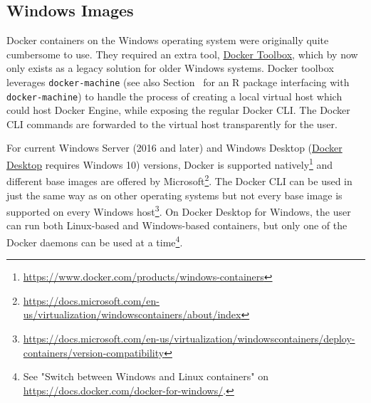 \hypertarget{windows-images}{%
\subsection{Windows Images}\label{windows-images}}

\label{windows}

Docker containers on the Windows operating system were originally quite
cumbersome to use. They required an extra tool,
\href{https://docs.docker.com/toolbox/}{Docker Toolbox}, which by now
only exists as a legacy solution for older Windows systems. Docker
toolbox leverages \texttt{docker-machine} (see also
Section~ for an R package interfacing with
\texttt{docker-machine}) to handle the process of creating a local
virtual host which could host Docker Engine, while exposing the regular
Docker CLI. The Docker CLI commands are forwarded to the virtual host
transparently for the user.

For current Windows Server (2016 and later) and Windows Desktop
(\href{https://www.docker.com/products/docker-desktop}{Docker Desktop}
requires Windows 10) versions, Docker is supported
natively\footnote{\href{https://www.docker.com/products/windows-containers}{https://www.docker.com/products/windows-containers}}
and different base images are offered by
Microsoft\footnote{\href{https://docs.microsoft.com/en-us/virtualization/windowscontainers/about/index}{https://docs.microsoft.com/en-us/virtualization/windowscontainers/about/index}}.
The Docker CLI can be used in just the same way as on other operating
systems but not every base image is supported on every Windows
host\footnote{\href{https://docs.microsoft.com/en-us/virtualization/windowscontainers/deploy-containers/version-compatibility}{https://docs.microsoft.com/en-us/virtualization/windowscontainers/deploy-containers/version-compatibility}}.
On Docker Desktop for Windows, the user can run both Linux-based and
Windows-based containers, but only one of the Docker daemons can be used
at a
time\footnote{See "Switch between Windows and Linux containers" on \href{https://docs.docker.com/docker-for-windows/}{https://docs.docker.com/docker-for-windows/}.}.

